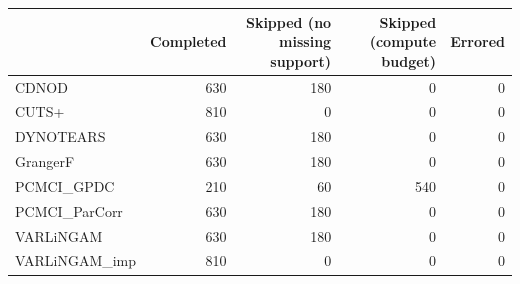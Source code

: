 \begin{tabular}{lrrrr}
\toprule
 & Completed & Skipped (no missing support) & Skipped (compute budget) & Errored \\
\midrule
CDNOD & 630 & 180 & 0 & 0 \\
CUTS+ & 810 & 0 & 0 & 0 \\
DYNOTEARS & 630 & 180 & 0 & 0 \\
GrangerF & 630 & 180 & 0 & 0 \\
PCMCI\_GPDC & 210 & 60 & 540 & 0 \\
PCMCI\_ParCorr & 630 & 180 & 0 & 0 \\
VARLiNGAM & 630 & 180 & 0 & 0 \\
VARLiNGAM\_imp & 810 & 0 & 0 & 0 \\
\bottomrule
\end{tabular}
